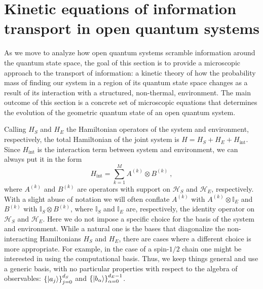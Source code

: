\documentclass[%
 reprint,
 superscriptaddress,
 aps,
 pra,
]{revtex4-2}
\theoremstyle{definition}
\begin{document}



\section{Kinetic equations of information transport in open quantum systems}
\label{sec:DYN}

As we move to analyze how open quantum systems scramble information around the
quantum state space, the goal of this section is to provide a microscopic approach
to the transport of information: a kinetic theory of how the probability mass of finding our system 
in a region of its quantum state space changes as a result of its interaction with a structured, non-thermal,
environment. The main outcome of this section is a concrete set of microscopic equations that determines
the evolution of the geometric quantum state of an open quantum system.

Calling $H_S$ and $H_E$ the Hamiltonian operators of the system and environment, respectively, 
the total Hamiltonian of the joint system is $H = H_S + H_E + H_{\mathrm{int}}$. Since $H_{\mathrm{int}}$
is the interaction term between system and environment, we can always put it in the form
\begin{equation}
H_{\mathrm{int}} = \sum_{k=1}^M A^{(k)} \otimes B^{(k)}~,
\end{equation}
where $A^{(k)}$ and $B^{(k)}$ are operators with support on $\mathcal{H}_S$ and $\mathcal{H}_E$,
respectively. With a slight abuse of notation we will often conflate $A^{(k)}$ with $A^{(k)}\otimes \mathbb{I}_E$
and $B^{(k)}$ with $\mathbb{I}_S \otimes B^{(k)}$, where $\mathbb{I}_S$ and $\mathbb{I}_E$ are, respectively,
the identity operator on $\mathcal{H}_{S}$ and $\mathcal{H}_E$.
Here we do not impose a specific choice for the basis of the system and environment. While a natural one
is the bases that diagonalize the non-interacting Hamiltonians $H_S$ and $H_E$, there are cases
where a different choice is more appropriate. For example, in the case of a spin-$1/2$ chain one might be interested 
in using the computational basis. Thus, we keep things general and use a generic basis, with no particular 
properties with respect to the algebra of observables: $\left\{ \ket{a_j}\right\}_{j=0}^{d_S}$ and $\left\{ \ket{b_\alpha}\right\}_{\alpha=0}^{d_E-1}$.
\end{document}
